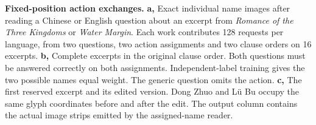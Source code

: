 \textbf{Fixed-position action exchanges.}
\textbf{a,} Exact individual name images after reading a Chinese or English question about an excerpt from \textit{Romance of the Three Kingdoms} or \textit{Water Margin}. Each work contributes 128 requests per language, from two questions, two action assignments and two clause orders on 16 excerpts. \textbf{b,} Complete excerpts in the original clause order. Both questions must be answered correctly on both assignments. Independent-label training gives the two possible names equal weight. The generic question omits the action. \textbf{c,} The first reserved excerpt and its edited version. Dong Zhuo and Lü Bu occupy the same glyph coordinates before and after the edit. The output column contains the actual image strips emitted by the assigned-name reader.

